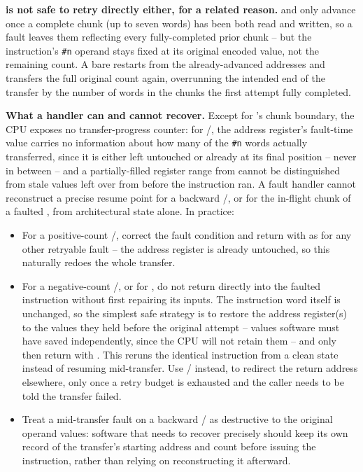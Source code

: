 \textbf{ is not safe to retry directly either, for a related reason.}  and  only advance
once a complete chunk (up to seven words) has been both read and written, so a fault leaves them reflecting every
fully-completed prior chunk -- but the instruction's \texttt{\#n} operand stays fixed at its original encoded value,
not the remaining count. A bare  restarts from the already-advanced addresses and transfers the full
original count again, overrunning the intended end of the transfer by the number of words in the chunks the first
attempt fully completed.

\textbf{What a handler can and cannot recover.} Except for 's chunk boundary, the CPU exposes no
transfer-progress counter: for /, the address register's fault-time value carries no
information about how many of the \texttt{\#n} words actually transferred, since it is either left untouched or
already at its final position -- never in between -- and a partially-filled register range from 
cannot be distinguished from stale values left over from before the instruction ran. A fault handler cannot
reconstruct a precise resume point for a backward /, or for the in-flight chunk of a
faulted , from architectural state alone. In practice:

\begin{itemize}
	\item For a positive-count /, correct the fault condition and return with  as
	      for any other retryable fault -- the address register is already untouched, so this naturally redoes the whole
	      transfer.
	\item For a negative-count /, or for , do not return directly into the faulted
	      instruction without first repairing its inputs. The instruction word itself is unchanged, so the simplest safe strategy
	      is to restore the address register(s) to the values they held before the original attempt -- values software must have
	      saved independently, since the CPU will not retain them -- and only then return with . This reruns the
	      identical instruction from a clean state instead of resuming mid-transfer. Use / instead,
	      to redirect the return address elsewhere, only once a retry budget is exhausted and the caller needs to be told the
	      transfer failed.
	\item Treat a mid-transfer fault on a backward / as destructive to the original operand values:
	      software that needs to recover precisely should keep its own record of the transfer's starting address and count before
	      issuing the instruction, rather than relying on reconstructing it afterward.
\end{itemize}

